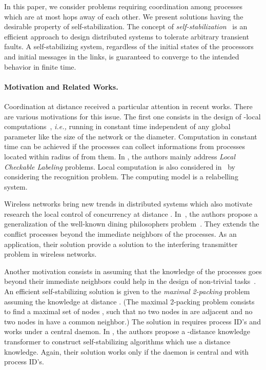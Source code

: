 \documentclass[11pt]{article}
\newcommand{\ie}{\emph{i.e., }}
\begin{document}
In this paper, we consider problems requiring coordination among processes which are 
at most  hops away of each other. We present solutions having the desirable property of 
self-stabilization.  The concept of {\em self-stabilization}~\cite{D74,D00} is an efficient 
approach to design distributed systems to tolerate arbitrary transient faults. A
self-stabilizing system, regardless of the initial states of the processors
and initial messages in the links, is guaranteed to converge to the intended
behavior in finite time.

\paragraph{Motivation and Related Works.}

Coordination at distance  received a particular attention in recent works.  
There are various motivations for this issue.  The first one consists in the design of -local
computations~\cite{NS93}, \ie running in constant time independent of any global parameter like 
the size of the network or the diameter.  Computation in constant time  can be achieved if the processes
can collect informations from processes located within radius of  from them. 
In \cite{NS93}, the authors mainly address \emph{Local Checkable Labeling} problems. 
Local computation is also considered in~\cite{GMM04} by considering the recognition problem.  
The computing model is a relabelling system.  


Wireless networks bring new trends in distributed systems which also motivate research the local control 
of concurrency at distance .  In~\cite{DNT06}, the authors propose a generalization of the 
well-known dining philosophers problem~\cite{Dij68}.  They extends the conflict processes beyond the 
immediate neighbors of the processes.  As an application, their solution provide a solution
to the interfering transmitter problem in wireless networks.

Another motivation consists in assuming that the knowledge of the processes goes beyond their immediate neighbors 
could help in the design of non-trivial tasks~\cite{GGHK04,GHJT06}. 
An efficient self-stabilizing solution is given to the \emph{maximal 2-packing} problem assuming
the knowledge at distance  \cite{GGHK04}. (The maximal 2-packing problem consists to find a 
maximal set of nodes , such that no two nodes in  are adjacent and no two nodes in  have a common neighbor.)
The solution in \cite{GGHK04} requires process ID's and works under a central daemon.  
In \cite{GHJT06}, the authors propose a -distance knowledge transformer to
construct self-stabilizing algorithms which use a  distance 
knowledge. Again, their solution works only if the daemon is central and with process ID's.  
\end{document}
